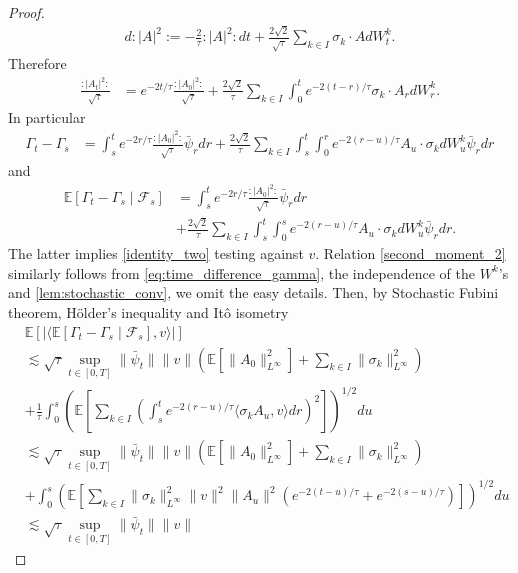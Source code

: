 \documentclass[a4paper,10pt]{amsart}
\newcommand{\wick}[1]{:\mathrel{#1}:}
\newcommand{\expt}[1]{\mathbb{E}\left[#1\right]}
\theoremstyle{remark}
\numberwithin{equation}{section}
\begin{document}
\begin{proof}
    \begin{align*}
       d\wick{|A|^2}=-\frac{2}{\tau}\wick{|A|^2}dt+\frac{2\sqrt{2}}{\sqrt{\tau}}\sum_{k\in I}\sigma_k\cdot AdW^k_t.
    \end{align*}
    Therefore 
    \begin{align*}
        \frac{\wick{|A_t|^2}}{\sqrt{\tau}}&=e^{-2t/\tau} \frac{\wick{|A_0|^2}}{\sqrt{\tau}}+\frac{2\sqrt{2}}{\tau}\sum_{k\in I}\int_0^t e^{-2(t-r)/\tau} \sigma_k\cdot A_r dW^k_r.
    \end{align*}
    In particular
    \begin{align}\label{eq:time_difference_gamma}
      \Gamma_t-\Gamma_s&=\int_s^t e^{-2r/\tau} \frac{\wick{|A_0|^2}}{\sqrt{\tau}}\bar{\psi}_r dr+\frac{2\sqrt{2}}{\tau}\sum_{k\in I }\int_s^t\int_0^r e^{-2(r-u)/\tau}A_u\cdot\sigma_k dW^k_u \bar{\psi}_r  dr   
    \end{align}
    and
    \begin{align*}
        \mathbb{E}\left[\Gamma_t-\Gamma_s\mid\mathcal{F}_s\right]&=\int_s^t e^{-2r/\tau} \frac{\wick{|A_0|^2}}{\sqrt{\tau}}\bar{\psi}_r dr\\ &+\frac{2\sqrt{2}}{\tau}\sum_{k\in I }\int_s^t\int_0^s e^{-2(r-u)/\tau}A_u\cdot\sigma_k dW^k_u \bar{\psi}_r  dr.
    \end{align*}
    The latter implies \eqref{identity_two} testing against $v$. Relation \eqref{second_moment_2} similarly follows from \eqref{eq:time_difference_gamma}, the independence of the $W^k$'s and \cref{lem:stochastic_conv}, we omit the easy details. Then, by Stochastic Fubini theorem, H\"older's inequality and It\^o isometry 
    \begin{align*}
        &\expt{\left\lvert \langle\mathbb{E}\left[\Gamma_t-\Gamma_s\mid\mathcal{F}_s\right],v\rangle\right\rvert}\\ & \lesssim \sqrt{\tau}\sup_{t\in [0,T]}\|\bar{\psi}_t\|\|v\|\left(\mathbb{E}[\|A_0\|^2_{L^\infty}]+\sum_{k\in I}\|\sigma_k\|_{L^{\infty}}^2\right)\\ & +\frac{1}{\tau}\int_0^s \left(\mathbb{E}\left[\sum_{k\in I}\left(\int_s^t e^{-2(r-u)/\tau} \langle \sigma_k A_u,v\rangle dr\right)^2\right]\right)^{1/2} du\\ & \lesssim \sqrt{\tau}\sup_{t\in [0,T]}\|\bar{\psi}_t\|\|v\|\left(\mathbb{E}[\|A_0\|^2_{L^\infty}]+\sum_{k\in I}\|\sigma_k\|_{L^{\infty}}^2\right)\\ & +\int_0^s \left(\mathbb{E}\left[\sum_{k\in I}\|\sigma_k\|_{L^{\infty}}^2\|v\|^2\|A_u\|^2 \left(e^{-2(t-u)/\tau}+e^{-2(s-u)/\tau}\right)\right]\right)^{1/2} du \\ & \lesssim \sqrt{\tau}\sup_{t\in [0,T]}\|\bar{\psi}_t\|\|v\|

\end{align*}
\end{proof}
\end{document}
